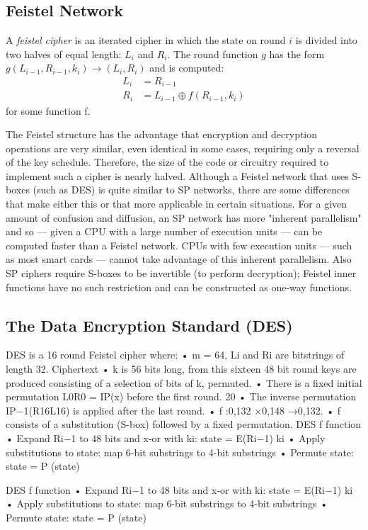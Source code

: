 \subsection{Feistel Network}
\begin{definition}
    A \textit{feistel cipher} is an iterated cipher
    in which the state on round $i$ is divided into two halves of equal length: $L_i$ and $R_i$.
    The round function $g$ has the form $g(L_{i−1}, R_{i−1}, k_i) \rightarrow (L_i, R_i)$ and is computed:
    \begin{align*}
        L_i &= R_{i−1} \\
        R_i &= L_{i−1} \oplus f(R_{i-1},k_i)
    \end{align*}
    for some function f.
\end{definition}
\begin{center}\feistel\end{center}
The Feistel structure has the advantage that encryption and decryption operations are very similar,
even identical in some cases, requiring only a reversal of the key schedule.
Therefore, the size of the code or circuitry required to implement such a cipher is nearly halved.
Although a Feistel network that uses S-boxes (such as DES) is quite similar to SP networks,
there are some differences that make either this or that more applicable in certain situations.
For a given amount of confusion and diffusion,
an SP network has more "inherent parallelism" and so — given a CPU with a large number of execution units — can be computed faster than a Feistel network.
CPUs with few execution units — such as most smart cards — cannot take advantage of this inherent parallelism.
Also SP ciphers require S-boxes to be invertible (to perform decryption);
Feistel inner functions have no such restriction and can be constructed as one-way functions.

\subsection{The Data Encryption Standard (DES)}
\begin{center}\des\end{center}
\begin{definition}

DES is a 16 round Feistel cipher where:
• m = 64, Li and Ri are bitstrings of length 32.
Ciphertext
• k is 56 bits long, from this sixteen 48 bit round keys are produced consisting of a selection of bits of k, permuted.
• There is a fixed initial permutation L0R0 = IP(x) before the first round. 20
• The inverse permutation IP−1(R16L16) is applied after the last round. • f :{0,1}32 ×{0,1}48 →{0,1}32.
• f consists of a substitution (S-box) followed by a fixed permutation.
DES f function
• Expand Ri−1 to 48 bits and x-or with ki: state = E(Ri−1) \oplus ki
• Apply substitutions to state: map 6-bit substrings to 4-bit substrings • Permute state: state = P (state)

DES f function
• Expand Ri−1 to 48 bits and x-or with ki: state = E(Ri−1) \oplus ki
• Apply substitutions to state: map 6-bit substrings to 4-bit substrings • Permute state: state = P (state)
\end{definition}

